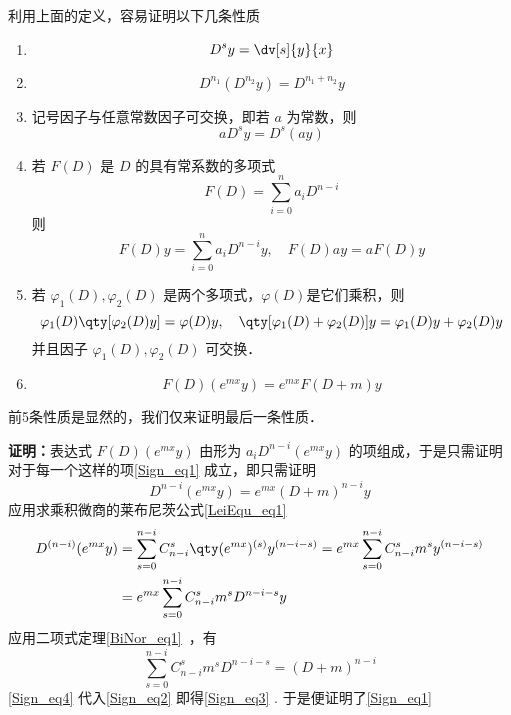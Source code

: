 利用上面的定义，容易证明以下几条性质
\begin{enumerate}
\item 
\begin{equation}
D^sy=\dv[s]{y}{x}
\end{equation}
\item 
\begin{equation}
D^{n_1}(D^{n_2}y)=D^{n_1+n_2}y
\end{equation}
\item 记号因子与任意常数因子可交换，即若 $a$ 为常数，则
\begin{equation}
aD^sy=D^s(ay)
\end{equation}
\item 若 $F(D)$ 是 $D$ 的具有常系数的多项式
\begin{equation}
F(D)=\sum_{i=0}^{n}a_iD^{n-i}
\end{equation}
则
\begin{equation}
F(D)y=\sum_{i=0}^{n}a_iD^{n-i}y,\quad F(D)ay=aF(D)y
\end{equation}
\item 若 $\varphi_1(D),\varphi_2(D)$ 是两个多项式，$\varphi(D)$是它们乘积，则
\begin{equation}
\varphi_1(D)\qty[\varphi_2(D)y]=\varphi(D)y,\quad \qty[\varphi_1(D)+\varphi_2(D)]y=\varphi_1(D)y+\varphi_2(D)y
\end{equation}
并且因子 $\varphi_1(D),\varphi_2(D)$ 可交换．
\item \begin{equation}\label{Sign_eq1}
F(D)(e^{mx}y)=e^{mx}F(D+m)y
\end{equation}
\end{enumerate}

前5条性质是显然的，我们仅来证明最后一条性质．

\textbf{证明：}表达式 $F(D)(e^{mx}y)$ 由形为 $a_{i}D^{n-i}(e^{mx}y)$ 的项组成，于是只需证明对于每一个这样的项\autoref{Sign_eq1} 成立，即只需证明
\begin{equation}\label{Sign_eq3}
D^{n-i}(e^{mx}y)=e^{mx}(D+m)^{n-i}y
\end{equation}
应用求乘积微商的莱布尼茨公式\autoref{LeiEqu_eq1}~
\begin{equation}\label{Sign_eq2}
\begin{aligned}
D^{(n-i)}(e^{mx}y)&=\sum_{s=0}^{n-i}C_{n-i}^s\qty(e^{mx})^{(s)}y^{(n-i-s)}=e^{mx}\sum_{s=0}^{n-i}C_{n-i}^sm^sy^{(n-i-s)}\\
&=e^{mx}\sum_{s=0}^{n-i}C_{n-i}^sm^sD^{n-i-s}y
\end{aligned}
\end{equation}
应用二项式定理\autoref{BiNor_eq1}~，有
\begin{equation}\label{Sign_eq4}
\sum_{s=0}^{n-i}C_{n-i}^sm^sD^{n-i-s}=(D+m)^{n-i}
\end{equation}
\autoref{Sign_eq4}  代入\autoref{Sign_eq2} 即得\autoref{Sign_eq3} . 于是便证明了\autoref{Sign_eq1} 

